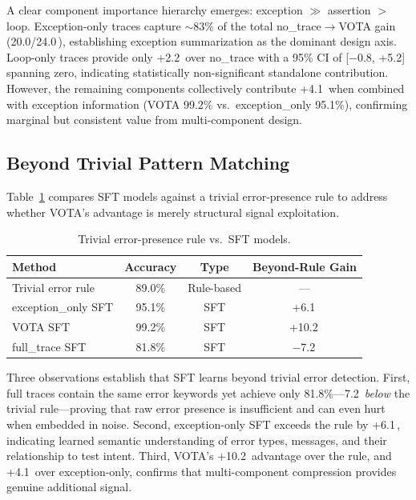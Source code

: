 \documentclass[11pt]{article}
\newcommand{\vota}{\textsc{VOTA}}
\newcommand{\pp}{\,\text{pp}}
\begin{document}
A clear component importance hierarchy emerges: exception $\gg$ assertion $>$ loop. Exception-only traces capture ${\sim}83\%$ of the total no\_trace$\to$VOTA gain (20.0/24.0\pp{}), establishing exception summarization as the dominant design axis. Loop-only traces provide only +2.2\pp{} over no\_trace with a 95\% CI of [$-$0.8, +5.2]\pp{} spanning zero, indicating statistically non-significant standalone contribution. However, the remaining components collectively contribute +4.1\pp{} when combined with exception information (\vota{} 99.2\% vs.\ exception\_only 95.1\%), confirming marginal but consistent value from multi-component design.

\subsection{Beyond Trivial Pattern Matching}

Table~\ref{tab:trivial} compares SFT models against a trivial error-presence rule to address whether \vota{}'s advantage is merely structural signal exploitation.

\begin{table}[t]
\centering
\caption{Trivial error-presence rule vs.\ SFT models.}
\label{tab:trivial}
\small
\begin{tabular}{lccc}
\toprule
\textbf{Method} & \textbf{Accuracy} & \textbf{Type} & \textbf{Beyond-Rule Gain} \\
\midrule
Trivial error rule & 89.0\% & Rule-based & --- \\
exception\_only SFT & 95.1\% & SFT & +6.1\pp{} \\
\vota{} SFT & 99.2\% & SFT & +10.2\pp{} \\
full\_trace SFT & 81.8\% & SFT & $-$7.2\pp{} \\
\bottomrule
\end{tabular}
\end{table}

Three observations establish that SFT learns beyond trivial error detection. First, full traces contain the same error keywords yet achieve only 81.8\%---7.2\pp{} \emph{below} the trivial rule---proving that raw error presence is insufficient and can even hurt when embedded in noise. Second, exception-only SFT exceeds the rule by +6.1\pp{}, indicating learned semantic understanding of error types, messages, and their relationship to test intent. Third, \vota{}'s +10.2\pp{} advantage over the rule, and +4.1\pp{} over exception-only, confirms that multi-component compression provides genuine additional signal.
\end{document}
